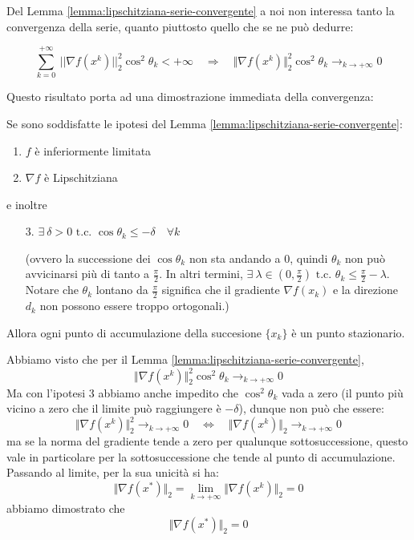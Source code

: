 Del Lemma \ref{lemma:lipschitziana-serie-convergente} a noi non
interessa tanto la convergenza della serie, quanto piuttosto quello
che se ne può dedurre:

$$\sum_{k=0}^{+ \infty} ~ || \nabla f(x^{k}) ||_{2}^{2} \cos^{2} \theta_{k} < + \infty \quad \Longrightarrow \quad \Vert \nabla f(x^{k}) \Vert_{2}^{2} \cos^{2} \theta_{k} \longrightarrow_{k\rightarrow + \infty} 0$$

Questo risultato porta ad una dimostrazione immediata della
convergenza:

\begin{theo}[Convergenza] Se sono soddisfatte le ipotesi del Lemma
\ref{lemma:lipschitziana-serie-convergente}:
\begin{enumerate}
\item $f$ \`e inferiormente limitata
\item $\nabla f$ \`e Lipschitziana
\end{enumerate} e inoltre
\begin{enumerate}
\item[3.]$\exists ~ \delta > 0 \text{ t.c. } \cos \theta_{k} \leq
-\delta \quad \forall k$

(ovvero la successione dei $\cos\theta_k$ non sta andando a $0$,
quindi $\theta_k$ non può avvicinarsi pi\`u di tanto a
$\frac{\pi}{2}$. In altri termini, $\exists ~ \lambda \in
(0,\frac{\pi}{2}) \text{ t.c. } \theta_{k} \leq
\frac{\pi}{2}-\lambda$. Notare che $\theta_k$ lontano da
$\frac{\pi}{2}$ significa che il gradiente $\nabla f (x_k)$ e la
direzione $d_k$ non possono essere troppo ortogonali.)
\end{enumerate} Allora ogni punto di accumulazione della succesione
$\{x_k\}$ \`e un punto stazionario.

\begin{thproof} Abbiamo visto che per il Lemma
\ref{lemma:lipschitziana-serie-convergente},
$$\Vert \nabla f(x^{k}) \Vert_{2}^{2} \cos^{2} \theta_{k} \longrightarrow_{k\rightarrow + \infty} 0$$
Ma con l'ipotesi 3 abbiamo anche impedito che $\cos^{2} \theta_{k}$
vada a zero (il punto pi\`u vicino a zero che il limite può raggiungere
\`e $-\delta$), dunque non può che essere:
$$ \Vert \nabla f(x^{k})\Vert^{2}_{2} \longrightarrow_{k \to +\infty} 0 \quad \Longleftrightarrow \quad \Vert \nabla f(x^{k})\Vert_{2} \longrightarrow_{k \to +\infty} 0$$
ma se la norma del gradiente tende a zero per qualunque
sottosuccessione, questo vale in particolare per la sottosuccessione
che tende al punto di accumulazione. Passando al limite, per la sua
unicit\`a si ha:
$$\Vert \nabla f (x^*) \Vert_2 = \lim_{k \to +\infty} \Vert \nabla f(x^k) \Vert_2 = 0$$
abbiamo dimostrato che
$$\Vert \nabla f (x^*) \Vert_2 = 0$$
\end{thproof}
\end{theo}

